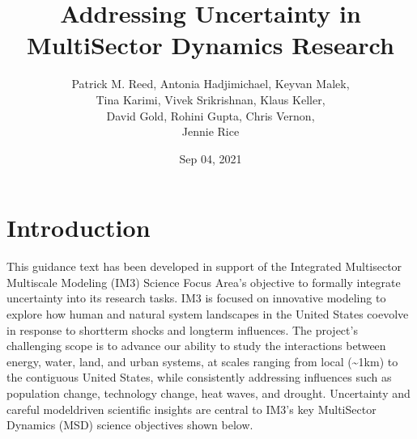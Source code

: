 \documentclass[letterpaper,10pt,english]{sphinxmanual}
\title{Addressing Uncertainty in MultiSector Dynamics Research}
\date{Sep 04, 2021}
\author{Patrick M.\@{} Reed, Antonia Hadjimichael, Keyvan Malek, 

         \textquotesingle{}Tina Karimi, Vivek Srikrishnan, Klaus Keller, 

         \textquotesingle{}David Gold, Rohini Gupta, Chris Vernon, 

         \textquotesingle{}Jennie Rice}
\begin{document}
\pagestyle{empty}
\sphinxmaketitle
\pagestyle{plain}
\sphinxtableofcontents
\pagestyle{normal}
\label{\detokenize{index::doc}}



\chapter{Introduction}
\label{\detokenize{1_introduction:introduction}}\label{\detokenize{1_introduction:id1}}\label{\detokenize{1_introduction::doc}}
\sphinxAtStartPar
This guidance text has been developed in support of the Integrated Multisector Multiscale Modeling (IM3) Science Focus Area’s objective to formally integrate uncertainty into its research tasks. IM3 is focused on innovative modeling to explore how human and natural system landscapes in the United States co\sphinxhyphen{}evolve in response to short\sphinxhyphen{}term shocks and long\sphinxhyphen{}term influences. The project’s challenging scope is to advance our ability to study the interactions between energy, water, land, and urban systems, at scales ranging from local (\textasciitilde{}1km) to the contiguous United States, while consistently addressing influences such as population change, technology change, heat waves, and drought. Uncertainty and careful model\sphinxhyphen{}driven scientific insights are central to IM3’s key MultiSector Dynamics (MSD) science objectives shown below.

\sphinxAtStartPar
{}

\sphinxAtStartPar
{}

\sphinxAtStartPar
{}

\sphinxAtStartPar
{}
\end{document}
